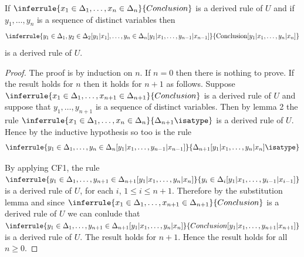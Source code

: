 \begin{corollary}
  If $\inferrule{x_1\in\Delta_1,\ldots,x_n\in\Delta_n}{Conclusion}$ is a derived rule of $U$ and if $y_1,\ldots,y_n$ is a sequence of distinct variables then
  \[ \inferrule{y_1\in\Delta_1,y_2\in\Delta_2[y_1|x_1],\ldots,y_n\in\Delta_n[y_1|x_1,\ldots,y_{n-1}|x_{n-1}]}{\text{Conclusion}[y_1|x_1,\ldots,y_n|x_n]}
  \]
  is a derived rule of $U$.
\end{corollary}
\begin{proof}
  The proof is by induction on $n$.
  If $n=0$ then there is nothing to prove.
  If the result holds for $n$ then it holds for $n+1$ as follows.
  Suppose $\inferrule{x_1\in\Delta_1,\ldots,x_{n+1}\in\Delta_{n+1}}{Conclusion}$ is a derived rule of $U$ and suppose that $y_1,\ldots,y_{n+1}$ is a sequence of distinct variables.
  Then by lemma 2 the rule $\inferrule{x_1\in\Delta_1,\ldots,x_n\in\Delta_n}{\Delta_{n+1}\isatype}$ is a derived rule of $U$.
  Hence by the inductive hypothesis so too is the rule
  \[\inferrule{y_1\in\Delta_1,\ldots,y_n\in\Delta_n[y_1|x_1,\ldots,y_{n-1}|x_{n-1}]}{\Delta_{n+1}[y_1|x_1,\ldots,y_n|x_n]\isatype}
  \]

  By applying CF1, the rule $\inferrule{y_1\in\Delta_1,\ldots,y_{n+1}\in\Delta_{n+1}[y_1|x_1,\ldots,y_n|x_n]}{y_i\in\Delta_i[y_1|x_1,\ldots,y_{i-1}|x_{i-1}]}$ is a derived rule of $U$, for each $i$, $1\leq i\leq n+1$.
  Therefore by the substitution lemma and since $\inferrule{x_1\in\Delta_1,\ldots,x_{n+1}\in\Delta_{n+1}}{Conclusion}$ is a derived rule of $U$ we can conlude that $\inferrule{y_1\in\Delta_1,\ldots,y_{n+1}\in\Delta_{n+1}[y_1|x_1,\ldots,y_n|x_n]}{Conclusion[y_1|x_1,\ldots,y_{n+1}|x_{n+1}]}$ is a derived rule of $U$.
  The result holds for $n+1$.
  Hence the result holds for all $n\geq 0$.
\end{proof}

